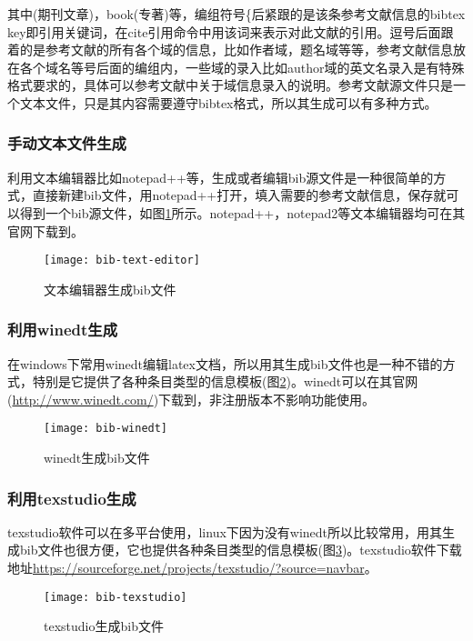 \documentclass[twoside]{article} %
\begin{document}
其中(期刊文章)，book(专著)等，编组符号\{后紧跟的是该条参考文献信息的bibtex key即引用关键词，在cite引用命令中用该词来表示对此文献的引用。逗号后面跟着的是参考文献的所有各个域的信息，比如作者域，题名域等等，参考文献信息放在各个域名等号后面的编组内，一些域的录入比如author域的英文名录入是有特殊格式要求的，具体可以参考文献\cite{胡振震2016}中关于域信息录入的说明。参考文献源文件只是一个文本文件，只是其内容需要遵守bibtex格式，所以其生成可以有多种方式。

\subsubsection{手动文本文件生成}

利用文本编辑器比如notepad++等，生成或者编辑bib源文件是一种很简单的方式，直接新建bib文件，用notepad++打开，填入需要的参考文献信息，保存就可以得到一个bib源文件，如图\ref{bib:texteditor}所示。notepad++，notepad2等文本编辑器均可在其官网下载到。

\begin{figure}[!htb]
  \centering
  \texttt{[image: bib-text-editor]}
  \caption{文本编辑器生成bib文件}\label{bib:texteditor}
\end{figure}

\subsubsection{利用winedt生成}
在windows下常用winedt编辑latex文档，所以用其生成bib文件也是一种不错的方式，特别是它提供了各种条目类型的信息模板(图\ref{bib:winedt})。winedt可以在其官网(\url{http://www.winedt.com/})下载到，非注册版本不影响功能使用。

\begin{figure}[!htb]
  \centering
  \texttt{[image: bib-winedt]}
  \caption{winedt生成bib文件}\label{bib:winedt}
\end{figure}

\subsubsection{利用texstudio生成}
texstudio软件可以在多平台使用，linux下因为没有winedt所以比较常用，用其生成bib文件也很方便，它也提供各种条目类型的信息模板(图\ref{bib:texstudio})。texstudio软件下载地址\url{https://sourceforge.net/projects/texstudio/?source=navbar}。

\begin{figure}[!htb]
  \centering
  \texttt{[image: bib-texstudio]}
  \caption{texstudio生成bib文件}\label{bib:texstudio}
\end{figure}
\end{document}
